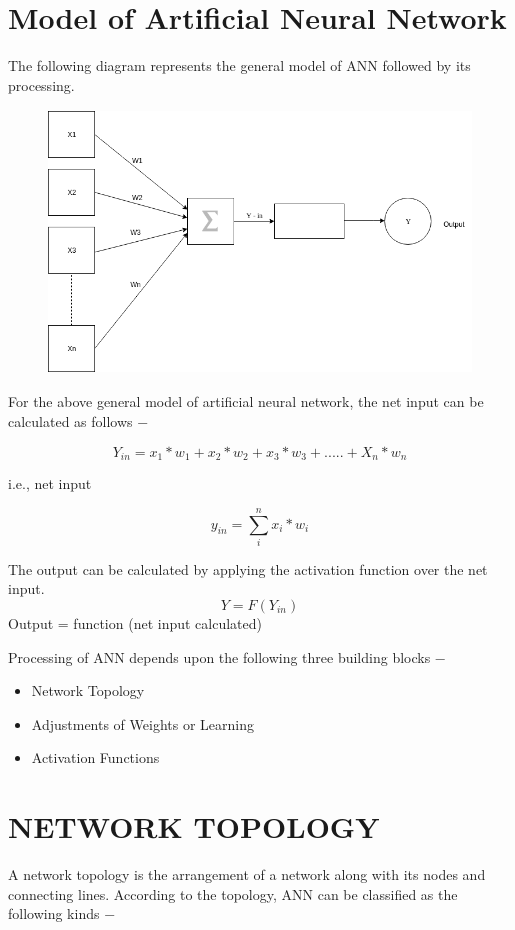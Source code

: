 \documentclass{report}
\begin{document}
\section{Model of Artificial Neural Network}
The following diagram represents the general model of ANN followed by its processing.

\begin{figure}[htbp]
\centering
\includegraphics[height=7cm]{Pictures/ann_model.png}
\caption{}
\label{}
\end{figure}

For the above general model of artificial neural network, the net input can be calculated as follows −

\[Y_{in} = x_{1}*w_{1} + x_{2}*w_{2} + x_{3}*w_{3} + .....+ X_{n}*w_{n}\]

i.e., net input

\[y_{in} = \sum_{i}^{n} x_{i}*w_{i}\]

The output can be calculated by applying the activation function over the net input.
\[Y = F(Y_{in})\]
Output = function (net input calculated)

Processing of ANN depends upon the following three building blocks −

\begin{itemize}
\item Network Topology
\item Adjustments of Weights or Learning
\item Activation Functions

\end{itemize}

\section{NETWORK TOPOLOGY}
A network topology is the arrangement of a network along with its nodes and connecting lines. According to the topology, ANN can be classified as the following kinds −
\end{document}
